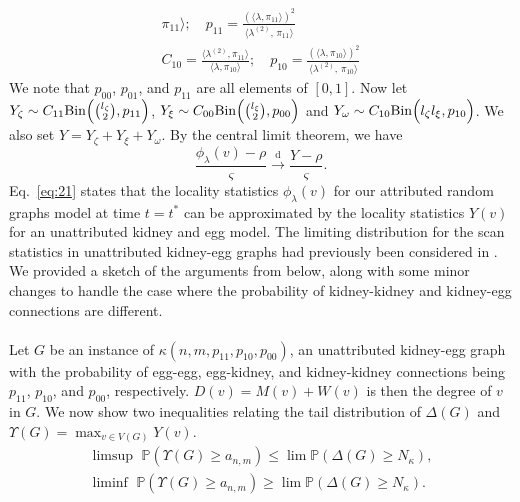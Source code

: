 \documentclass[10pt,journal,compsoc]{IEEEtran}
\theoremstyle{definition}
\begin{document}
\begin{IEEEproof}[Lemma~8]
\begin{gather}
{     \pi_{11}\rangle}; \quad p_{11} = \tfrac{(\langle \lambda, \pi_{11}
     \rangle)^{2}}{\langle \lambda^{(2)},\, \pi_{11} \rangle} \\
 C_{10} = \tfrac{\langle \lambda^{(2)}, \pi_{11} \rangle}{\langle \lambda,
     \pi_{10}\rangle}; \quad p_{10} = \tfrac{(\langle \lambda, \pi_{10}
     \rangle)^{2}}{\langle \lambda^{(2)},\, \pi_{10} \rangle} 
 \end{gather}
 We note that $p_{00}$, $p_{01}$, and $p_{11}$ are all elements of
 $[0,1]$. Now let $Y_{\zeta} \sim C_{11}
 \mathrm{Bin}\Bigl(\tbinom{l_{\zeta}}{2}, p_{11}\Bigr)$, $Y_{\xi} \sim
 C_{00} \mathrm{Bin}\Bigl(\tbinom{l_\xi}{2}, p_{00}\Bigr)$ and
 $Y_{\omega} \sim C_{10} \mathrm{Bin}\Bigl( l_{\zeta} l_{\xi}, p_{10}
 \Bigr)$. We also set $Y = Y_{\zeta} + Y_{\xi} + Y_{\omega}$. By the
 central limit theorem, we have
\begin{equation}
  \label{eq:21}
 \frac{\phi_{\lambda}(v) - \rho}{\varsigma}
 \overset{\mathrm{d}}{\longrightarrow}  \frac{Y - \rho}{\varsigma}.
\end{equation}
Eq.~\eqref{eq:21} states that the locality statistics
$\phi_\lambda(v)$ for our attributed random graphs model at time $t =
t^{*}$ can be approximated by the locality statistics $Y(v)$ for an
unattributed kidney and egg model. The limiting distribution for the
scan statistics in unattributed kidney-egg graphs had previously been
considered in \cite{rukhin12}. We
provided a sketch of the arguments from
\cite{rukhin12} below, along with some
minor changes to handle the case where the probability of
kidney-kidney and
kidney-egg connections are different. \\ \\
\noindent
Let $G$ be an instance of
$\kappa(n,m,p_{11}, p_{10}, p_{00})$, an unattributed kidney-egg graph
with the probability of egg-egg, egg-kidney, and kidney-kidney
connections being $p_{11}$, $p_{10}$, and $p_{00}$,
respectively. $D(v) = M(v) + W(v)$ is then the degree of $v$ in
$G$. We now show two inequalities relating the tail distribution of
$\Delta(G)$ and $\Upsilon(G) = \max_{v \in V(G)} Y(v)$.
\begin{gather}
  \label{eq:27}
    \limsup\,\, \mathbb{P}( \Upsilon(G) \geq a_{n,m} ) \leq \lim
   \mathbb{P}( \Delta(G) \geq N_\kappa), \\
   \label{eq:30}
  \liminf\,\, \mathbb{P}( \Upsilon(G) \geq a_{n,m} ) \geq \lim \mathbb{P}(
  \Delta(G) \geq N_{\kappa}).
\end{gather}
\begin{IEEEproof}[Eq.~\eqref{eq:27}]

\end{IEEEproof}
\end{IEEEproof}
\end{document}
